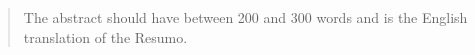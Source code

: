 \begin{abstract}
The abstract should have between 200 and 300 words and is the English
translation of the Resumo.

\lipsum[3-4]
\end{abstract}
